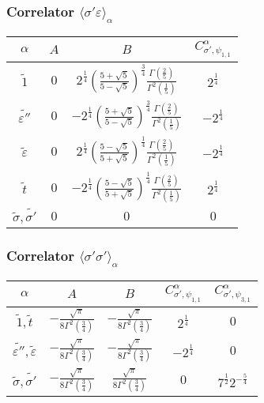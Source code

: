 \documentclass[a4paper,12pt]{report}
\begin{document}
\subsubsection{Correlator $\langle \sigma'\varepsilon\rangle_{\alpha}$}
\begin{center}
\begin{tabular}{|c|c|c|c|}\hline
$\alpha$ &  $A$  & $B$ & $ C_{\sigma',\psi_{1,1}}^{\alpha}$   \\
\hline

$\tilde{1}$ & $0$ & $2^{\frac{1}{4}}\left(\frac{5+\sqrt{5}}{5-\sqrt{5}} \right)^{\frac{3}{4}}\frac{\Gamma \left(\frac{2}{5} \right)}{\Gamma ^{2}\left(\frac{1}{5} \right)}$ & $2^{\frac{1}{4}}$  \\

$\tilde{\varepsilon''}$ & $0$ & $-2^{\frac{1}{4}}\left(\frac{5+\sqrt{5}}{5-\sqrt{5}} \right)^{\frac{3}{4}}\frac{\Gamma \left(\frac{2}{5} \right)}{\Gamma ^{2}\left(\frac{1}{5} \right)}$ & $-2^{\frac{1}{4}}$  \\

$\tilde{\varepsilon}$ & $0$ & $2^{\frac{1}{4}}\left(\frac{5-\sqrt{5}}{5+\sqrt{5}} \right)^{\frac{1}{4}}\frac{\Gamma \left(\frac{2}{5} \right)}{\Gamma ^{2}\left(\frac{1}{5} \right)}$ & $-2^{\frac{1}{4}}$  \\

$\tilde{t}$ &  $0$ & $-2^{\frac{1}{4}}\left(\frac{5-\sqrt{5}}{5+\sqrt{5}} \right)^{\frac{1}{4}}\frac{\Gamma \left(\frac{2}{5} \right)}{\Gamma ^{2}\left(\frac{1}{5} \right)}$ & $2^{\frac{1}{4}}$  \\

$\tilde{\sigma}, \tilde{\sigma'}$ & $0$ & $0$& $0$  \\ \hline
\end{tabular}
\end{center}


\subsubsection{Correlator $\langle \sigma'\sigma'\rangle_{\alpha}$}
\begin{center}
\begin{tabular}{|c|c|c|c|c|}\hline
$\alpha$ &  $A$  & $B$ & $ C_{\sigma',\psi_{1,1}}^{\alpha}$ &  $ C_{\sigma',\psi_{3,1}}^{\alpha}$ \\
\hline

$\tilde{1}, \tilde{t}$ & $-\frac{\sqrt{\pi }}{8\Gamma ^{2}\left(\frac{3}{4} \right)}$ & $-\frac{\sqrt{\pi }}{8\Gamma ^{2}\left(\frac{3}{4} \right)}$ & $2^{\frac{1}{4}}$ & $0$ \\

$\tilde{\varepsilon''}, \tilde{\varepsilon}$ & $-\frac{\sqrt{\pi }}{8\Gamma ^{2}\left(\frac{3}{4} \right)}$ & $-\frac{\sqrt{\pi }}{8\Gamma ^{2}\left(\frac{3}{4} \right)}$ & $-2^{\frac{1}{4}}$ & $0$ \\

$\tilde{\sigma}, \tilde{\sigma'}$ & $-\frac{\sqrt{\pi }}{8\Gamma ^{2}\left(\frac{3}{4} \right)}$ &
$\frac{\sqrt{\pi }}{8\Gamma ^{2}\left(\frac{3}{4} \right)}$ & $0$ & $7^{\frac{1}{2}}2^{-\frac{5}{4}}$ \\ \hline
\end{tabular}
\end{center}
\end{document}
